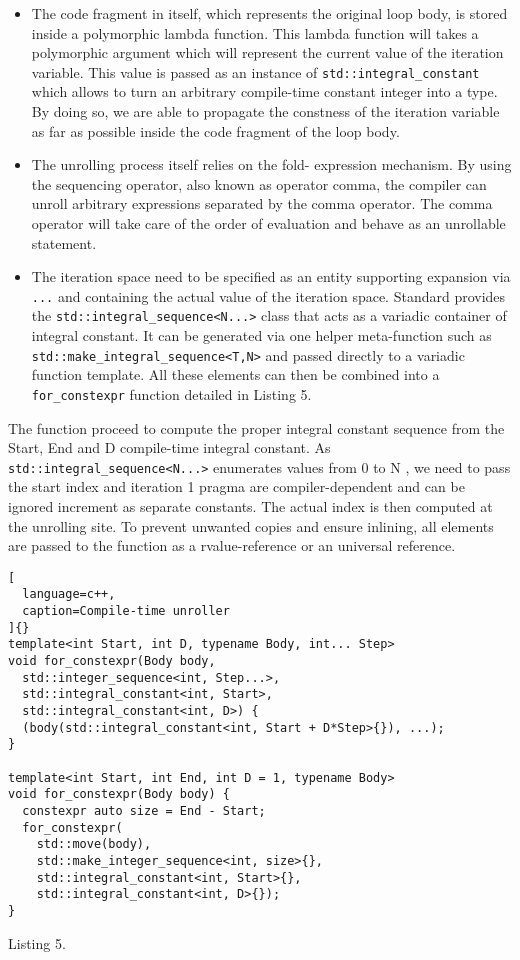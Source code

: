 \documentclass[../../main.tex]{subfiles}
\begin{document}
\begin{itemize}
\item The code fragment in itself, which represents
the original loop body, is stored inside a
polymorphic lambda function. This lambda
function will takes a polymorphic argument which
will represent the current value of the iteration
variable. This value is passed as an instance of
\lstinline{std::integral_constant} which allows to
turn an arbitrary compile-time constant integer into
a type. By doing so, we are able to propagate the
constness of the iteration variable as far as possible
inside the code fragment of the loop body.

\item The unrolling process itself relies on the fold-
expression mechanism. By using the sequencing
operator, also known as operator comma, the
compiler can unroll arbitrary expressions separated
by the comma operator. The comma operator will
take care of the order of evaluation and behave as
an unrollable statement.

\item The iteration space need to be specified
as an entity supporting expansion via \lstinline{...}
and containing the actual value of the
iteration space. Standard \cpp provides the
\lstinline{std::integral_sequence<N...>} class that
acts as a variadic container of integral constant. It
can be generated via one helper meta-function such
as \lstinline{std::make_integral_sequence<T,N>}
and passed directly to a variadic function template.
All these elements can then be combined into a
\lstinline{for_constexpr} function detailed in Listing 5.
\end{itemize}

The function proceed to compute the proper
integral constant sequence from the Start,
End and D compile-time integral constant. As
\lstinline{std::integral_sequence<N...>} enumerates values
from 0 to N , we need to pass the start index and iteration
1 pragma are compiler-dependent and can be ignored
increment as separate constants. The actual index is then
computed at the unrolling site. To prevent unwanted copies
and ensure inlining, all elements are passed to the function
as a rvalue-reference or an universal reference.

\begin{lstlisting}[
  language=c++,
  caption=Compile-time unroller
]{}
template<int Start, int D, typename Body, int... Step>
void for_constexpr(Body body,
  std::integer_sequence<int, Step...>,
  std::integral_constant<int, Start>,
  std::integral_constant<int, D>) {
  (body(std::integral_constant<int, Start + D*Step>{}), ...);
}

template<int Start, int End, int D = 1, typename Body>
void for_constexpr(Body body) {
  constexpr auto size = End - Start;
  for_constexpr(
    std::move(body),
    std::make_integer_sequence<int, size>{},
    std::integral_constant<int, Start>{},
    std::integral_constant<int, D>{});
}
\end{lstlisting}
Listing 5.
\end{document}
